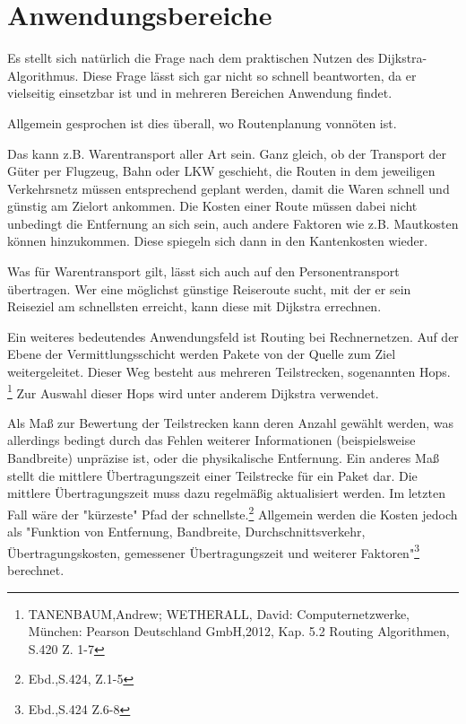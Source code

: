 \section{Anwendungsbereiche}
Es stellt sich natürlich die Frage nach dem praktischen Nutzen des Dijkstra-Algorithmus. Diese Frage lässt sich gar nicht so schnell beantworten, da er vielseitig einsetzbar ist und in mehreren Bereichen Anwendung findet.

\parindent0pt Allgemein gesprochen ist dies überall, wo Routenplanung vonnöten ist.

\parindent0pt
Das kann z.B. Warentransport aller Art sein. Ganz gleich, ob der Transport der Güter per Flugzeug, Bahn oder LKW geschieht, die Routen in dem jeweiligen Verkehrsnetz müssen entsprechend geplant werden, damit die Waren schnell und günstig am Zielort ankommen. Die Kosten einer Route müssen dabei nicht unbedingt die Entfernung an sich sein, auch andere Faktoren wie z.B. Mautkosten können hinzukommen. Diese spiegeln sich dann in den Kantenkosten wieder.

\parindent0pt Was für Warentransport gilt, lässt sich auch auf den Personentransport übertragen. Wer eine möglichst günstige Reiseroute sucht, mit der er sein Reiseziel am schnellsten erreicht, kann diese mit Dijkstra errechnen.

\parindent0pt Ein weiteres bedeutendes Anwendungsfeld ist Routing bei Rechnernetzen. Auf der Ebene der Vermittlungsschicht werden Pakete von der Quelle zum Ziel weitergeleitet. Dieser Weg besteht aus mehreren Teilstrecken, sogenannten Hops. \footnote{TANENBAUM,Andrew; WETHERALL, David: Computernetzwerke, München: Pearson Deutschland GmbH,2012, Kap. 5.2 Routing Algorithmen, S.420 Z. 1-7} Zur Auswahl dieser Hops wird unter anderem Dijkstra verwendet. 

\parindent0pt
Als Maß zur Bewertung der Teilstrecken kann deren Anzahl gewählt werden, was allerdings bedingt durch das Fehlen weiterer Informationen (beispielsweise Bandbreite) unpräzise ist, oder die physikalische Entfernung. Ein anderes Maß stellt die mittlere Übertragungszeit einer Teilstrecke für ein Paket dar. Die mittlere Übertragungszeit muss dazu regelmäßig aktualisiert werden. Im letzten Fall wäre der "kürzeste" Pfad der schnellste.\footnote{Ebd.,S.424, Z.1-5}
Allgemein werden die Kosten jedoch als "Funktion von Entfernung, Bandbreite, Durchschnittsverkehr, Übertragungskosten, gemessener Übertragungszeit und weiterer Faktoren"\footnote{Ebd.,S.424 Z.6-8} berechnet.
